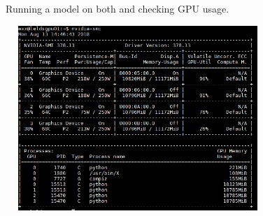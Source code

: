 \documentclass[a4paper]{article}
\begin{document}
\raggedright
Running a model on both and checking GPU usage.

\centering
\includegraphics[width=10cm, height=7cm]{./images/usage.PNG}




\raggedright
\end{document}
